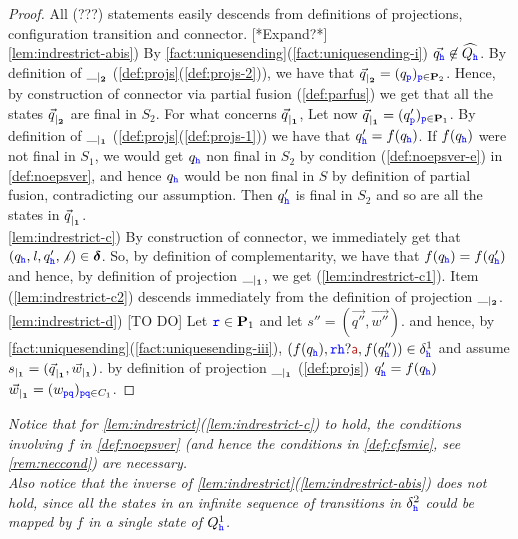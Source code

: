 \begin{proof}
All (???) statements easily
descends from definitions of projections, configuration transition and connector.
[*Expand?*]\\
\ref{lem:indrestrict-abis})
By \cref{fact:uniquesending}(\ref{fact:uniquesending-i}) $\vec{q_{\mathtt{\color{blue}{ {h}}}}}\not\in\widehat{Q_{\mathtt{\color{blue}{ {h}}}}}$.
By  definition of ${\_}_{\mid_{\mathbf{2}}}$ (\cref{def:projs}(\ref{def:projs-2})), 
we have that ${\vec{q}}_{\mid_{\mathbf{2}}} = (q_{\mathtt{\color{blue}{ {p}}}})_{{\mathtt{\color{blue}{ {p}}}}\in\mathbf{P}_2}$. 
Hence, by construction of connector via partial fusion (\cref{def:parfus}) we get that 
all the states ${\vec{q}}_{\mid_{\mathbf{2}}}$ are final in $S_2$.
For what concerns ${\vec{q}}_{\mid_{\mathbf{1}}}$, 
Let now ${\vec{q}}_{\mid_{\mathbf{1}}} = (q'_{\mathtt{\color{blue}{ {p}}}})_{{\mathtt{\color{blue}{ {p}}}}\in\mathbf{P}_1}$.
By definition of ${\_}_{\mid_{\mathbf{1}}}$ (\cref{def:projs}(\ref{def:projs-1})) we have  that
$q'_{\mathtt{\color{blue}{ {h}}}} = f(q_{\mathtt{\color{blue}{ {h}}}})$. If $f(q_{\mathtt{\color{blue}{ {h}}}})$ were not final in $S_1$, we would get  
$q_{\mathtt{\color{blue}{ {h}}}}$ non final in $S_2$ by condition (\ref{def:noepsver-e}) in \cref{def:noepsver}, and hence $q_{\mathtt{\color{blue}{ {h}}}}$ would be non final in $S$
by definition of partial fusion, contradicting our assumption. Then $q'_{\mathtt{\color{blue}{ {h}}}}$ is final in $S_2$
and so are all the states in ${\vec{q}}_{\mid_{\mathbf{1}}}$.\\
%
\ref{lem:indrestrict-c})
By construction of connector, we immediately get that $(q_{\mathtt{\color{blue}{ {h}}}},\mathit{l},q'_{\mathtt{\color{blue}{ {h}}}},\not\iota)\in\bm{\delta}$.
So, by definition of complementarity, we have that $f(q_{\mathtt{\color{blue}{ {h}}}})=f(q'_{\mathtt{\color{blue}{ {h}}}})$ and hence,
by definition of projection ${\_}_{\mid_{\mathbf{1}}}$, we get (\ref{lem:indrestrict-c1}).
Item (\ref{lem:indrestrict-c2}) descends immediately from the definition of projection 
${\_}_{\mid_{\mathbf{2}}}$.\\
\ref{lem:indrestrict-d}) [TO DO]
Let ${\mathtt{\color{blue}{ {r}}}}\in\mathbf{P}_1$ and let $s''= (\vec{q''},\vec{w''})$.
and hence, by \cref{fact:uniquesending}(\ref{fact:uniquesending-iii}),
$(f(q_\HH),\ttr\HH?\msg[a],f(q''_\HH))\in\delta^1_\HH$
 and assume
${s}_{\mid_{\mathbf{1}}}=({\vec{q}}_{\mid_{\mathbf{1}}},{\vec{w}}_{\mid_{\mathbf{1}}})$.
by definition of projection ${\_}_{\mid_{\mathbf{1}}}$ (\cref{def:projs}) $q'_{\mathtt{\color{blue}{ {h}}}} = f(q_{\mathtt{\color{blue}{ {h}}}})$ 
${\vec{w}}_{\mid_{\mathbf{1}}} =  (w_{{\mathtt{\color{blue}{ {p}}}}{\mathtt{\color{blue}{ {q}}}}})_{{\mathtt{\color{blue}{ {p}}}}{\mathtt{\color{blue}{ {q}}}}\in C_1}$.
\end{proof}

\begin{remark}{\em
Notice that for \cref{lem:indrestrict}(\ref{lem:indrestrict-c}) to hold,  
the conditions involving $f$ in \cref{def:noepsver} (and hence the conditions in \cref{def:cfsmie},
see \cref{rem:neccond}) are necessary.\\
Also notice that the inverse of \cref{lem:indrestrict}(\ref{lem:indrestrict-abis})
does not hold, since all the states in an infinite sequence of transitions in $\delta^2_{\mathtt{\color{blue}{ {h}}}}$
could be mapped by $f$ in a single state of $Q^1_{\mathtt{\color{blue}{ {h}}}}$.
\finex
}
\end{remark}



